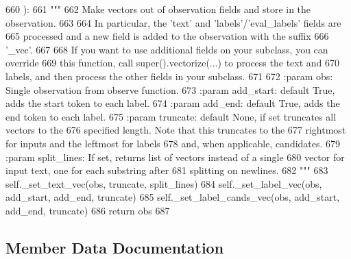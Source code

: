 \begin{DoxyCode}
660     ):
661         \textcolor{stringliteral}{"""}
662 \textcolor{stringliteral}{        Make vectors out of observation fields and store in the observation.}
663 \textcolor{stringliteral}{}
664 \textcolor{stringliteral}{        In particular, the 'text' and 'labels'/'eval\_labels' fields are}
665 \textcolor{stringliteral}{        processed and a new field is added to the observation with the suffix}
666 \textcolor{stringliteral}{        '\_vec'.}
667 \textcolor{stringliteral}{}
668 \textcolor{stringliteral}{        If you want to use additional fields on your subclass, you can override}
669 \textcolor{stringliteral}{        this function, call super().vectorize(...) to process the text and}
670 \textcolor{stringliteral}{        labels, and then process the other fields in your subclass.}
671 \textcolor{stringliteral}{}
672 \textcolor{stringliteral}{        :param obs:         Single observation from observe function.}
673 \textcolor{stringliteral}{        :param add\_start:   default True, adds the start token to each label.}
674 \textcolor{stringliteral}{        :param add\_end:     default True, adds the end token to each label.}
675 \textcolor{stringliteral}{        :param truncate:    default None, if set truncates all vectors to the}
676 \textcolor{stringliteral}{                            specified length. Note that this truncates to the}
677 \textcolor{stringliteral}{                            rightmost for inputs and the leftmost for labels}
678 \textcolor{stringliteral}{                            and, when applicable, candidates.}
679 \textcolor{stringliteral}{        :param split\_lines: If set, returns list of vectors instead of a single}
680 \textcolor{stringliteral}{                            vector for input text, one for each substring after}
681 \textcolor{stringliteral}{                            splitting on newlines.}
682 \textcolor{stringliteral}{        """}
683         self.\_set\_text\_vec(obs, truncate, split\_lines)
684         self.\_set\_label\_vec(obs, add\_start, add\_end, truncate)
685         self.\_set\_label\_cands\_vec(obs, add\_start, add\_end, truncate)
686         \textcolor{keywordflow}{return} obs
687 
\end{DoxyCode}


\subsection{Member Data Documentation}
\mbox{\label{classparlai_1_1agents_1_1legacy__agents_1_1seq2seq_1_1torch__agent__v1_1_1TorchAgent_a81f970d715f2525ad342330a28703c5c}} 

